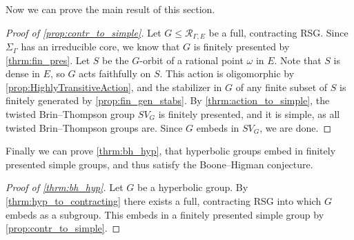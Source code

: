 \documentclass[11pt,letterpaper]{amsart}
\theoremstyle{definition}
\newcommand{\R}{\mathcal{R}}
\begin{document}
Now we can prove the main result of this section.

\begin{proof}[Proof of \cref{prop:contr_to_simple}]
Let $G\le \R_{\Gamma,E}$ be a full, contracting RSG. Since $\Sigma_\Gamma$ has an irreducible core, we know that $G$ is finitely presented by \cref{thrm:fin_pres}. Let $S$ be the $G$-orbit of a rational point $\omega$ in $E$. Note that $S$ is dense in $E$, so $G$ acts faithfully on $S$. This action is oligomorphic by \cref{prop:HighlyTransitiveAction}, and the stabilizer in $G$ of any finite subset of $S$ is finitely generated by \cref{prop:fin_gen_stabs}. By \cref{thrm:action_to_simple}, the twisted Brin--Thompson group $SV_G$ is finitely presented, and it is simple, as all twisted Brin--Thompson groups are. Since $G$ embeds in $SV_G$, we are done.
\end{proof}

Finally we can prove \cref{thrm:bh_hyp}, that hyperbolic groups embed in finitely presented simple groups, and thus satisfy the Boone--Higman conjecture.

\begin{proof}[Proof of \cref{thrm:bh_hyp}]
Let $G$ be a hyperbolic group. By \cref{thrm:hyp_to_contracting} there exists a full, contracting RSG into which $G$ embeds as a subgroup. This embeds in a finitely presented simple group by \cref{prop:contr_to_simple}.
\end{proof}
\end{document}
